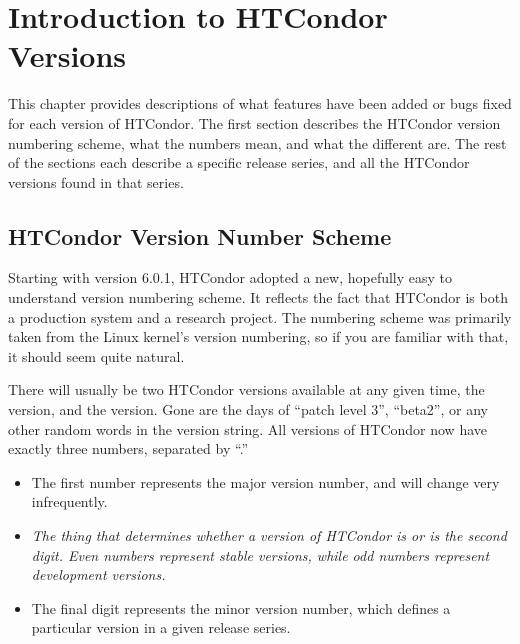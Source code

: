 \section{\label{sec:History-Intro}Introduction to HTCondor Versions}

This chapter provides descriptions of what features have been added or
bugs fixed for each version of HTCondor.
The first section describes the HTCondor version numbering scheme, what
the numbers mean, and what the different  are.
The rest of the sections each describe a specific release series, and
all the HTCondor versions found in that series.

\subsection{\label{sec:Version-Number-Scheme}
HTCondor Version Number Scheme}

Starting with version 6.0.1, HTCondor adopted a new, hopefully easy to
understand version numbering scheme.
It reflects the fact that HTCondor is both a production system and a
research project.
The numbering scheme was primarily taken from the Linux kernel's
version numbering, so if you are familiar with that, it should seem
quite natural.

There will usually be two HTCondor versions available at any given time,
the  version, and the  version.
Gone are the days of ``patch level 3'', ``beta2'', or any other random
words in the version string.
All versions of HTCondor now have exactly three numbers, separated by
``.''   

\begin{itemize}

\item The first number represents the major version number, and will
change very infrequently.

\item \emph{The thing that determines whether a version of HTCondor is
 or  is the second digit.
Even numbers represent stable versions, while odd numbers represent
development versions.}

\item The final digit represents the minor version number, which
defines a particular version in a given release series.

\end{itemize}


